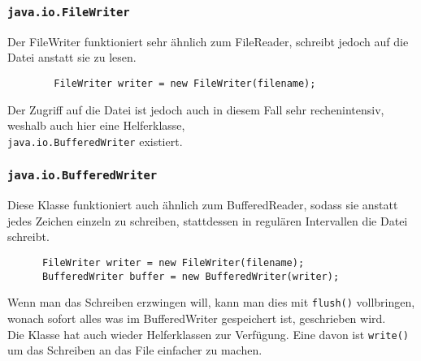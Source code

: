 \documentclass{article}
\begin{document}
	  \cprotect\subsubsection{\verb|java.io.FileWriter|}
	  Der FileWriter funktioniert sehr ähnlich zum FileReader, schreibt jedoch auf die Datei anstatt sie zu lesen. 
	  \begin{verbatim}
	  	FileWriter writer = new FileWriter(filename);  
	  \end{verbatim}  
	  Der Zugriff auf die Datei ist jedoch auch in diesem Fall sehr rechenintensiv, weshalb auch hier eine Helferklasse, \\ \verb|java.io.BufferedWriter| existiert.
	  \cprotect\subsubsection{\verb|java.io.BufferedWriter|}
	  Diese Klasse funktioniert auch ähnlich zum BufferedReader, sodass sie anstatt jedes Zeichen einzeln zu schreiben, stattdessen in regulären Intervallen die Datei schreibt. 
	  \begin{verbatim}
	  FileWriter writer = new FileWriter(filename);
	  BufferedWriter buffer = new BufferedWriter(writer);
	  \end{verbatim}
	  Wenn man das Schreiben erzwingen will, kann man dies mit \verb|flush()| vollbringen, wonach sofort alles was im BufferedWriter gespeichert ist, geschrieben wird. \\
	  Die Klasse hat auch wieder Helferklassen zur Verfügung. Eine davon ist \verb|write()| um das Schreiben an das File einfacher zu machen.  
\end{document}
